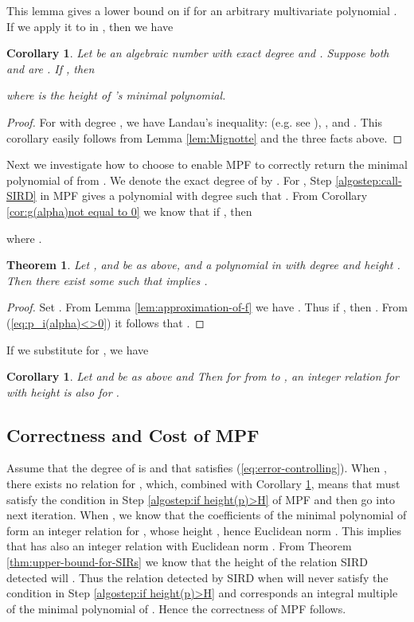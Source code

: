 \documentclass{sig-alternate}
\newtheorem{thm}[theorem]{Theorem}
\newtheorem{cor}[theorem]{Corollary}
\numberwithin{theorem}{section} \numberwithin{equation}{section}
\begin{document}
This lemma gives a lower bound on  if  for an
arbitrary multivariate polynomial . If we apply it to  in
, then we have
\begin{cor}\label{cor:g(alpha)not equal to 0}
Let  be an algebraic number with exact degree  and
. Suppose both
 and  are . If
, then

where  is the height of 's minimal
polynomial.
\end{cor}

\begin{proof}
For  with degree , we
have Landau's inequality:  (e.g. see \cite[p.
154]{GG1999}), , and .
This corollary  easily follows from Lemma \ref{lem:Mignotte} and the
three facts above.
\end{proof}

Next we investigate how to choose  to enable MPF to
correctly return the minimal polynomial of  from
. We denote the exact degree of  by . For , Step \ref{algostep:call-SIRD} in MPF gives
a polynomial  with degree  such that
.
From Corollary \ref{cor:g(alpha)not equal to
0} we know that if , then

where . 



\begin{thm}
Let ,  and  be as above, and  a polynomial in  with degree  and
height . Then there exist some  such that
 implies .
\end{thm}

\begin{proof}


Set . From Lemma \ref{lem:approximation-of-f} we
have . Thus if ,
then  . From (\ref{eq:p_i(alpha)<>0}) it follows that
.
\end{proof}

If we substitute  for , we have

\begin{cor}\label{cor:epsilon-control}
Let  and   be as above and
 Then for  from  to , an integer relation for
 with height  is also for .
\end{cor}


\subsection{Correctness and Cost of MPF}


Assume that the degree of  is  and that 
satisfies (\ref{eq:error-controlling}). When , there
exists no relation for , which, combined
with Corollary \ref{cor:epsilon-control}, means that  must
satisfy the condition in Step \ref{algostep:if height(p)>H} of MPF
and then go into next iteration. When , we know that
the coefficients of the minimal polynomial of  form an
integer relation for , whose height
, hence Euclidean norm . This implies
that  has also an
integer relation with Euclidean norm . From
Theorem \ref{thm:upper-bound-for-SIRs} we know that the height of
the relation SIRD detected will . Thus the
relation detected by SIRD when  will never satisfy the
condition in Step \ref{algostep:if height(p)>H}  and corresponds an
integral multiple of the minimal polynomial of . Hence the
correctness of MPF follows.
\end{document}
